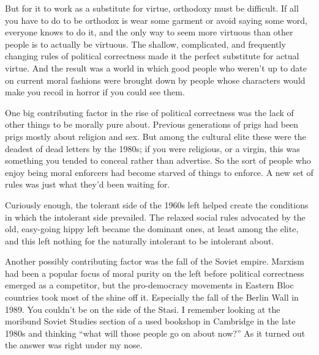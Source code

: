 But for it to work as a substitute for virtue, orthodoxy must be
difficult. If all you have to do to be orthodox is wear some garment or
avoid saying some word, everyone knows to do it, and the only way to
seem more virtuous than other people is to actually be virtuous. The
shallow, complicated, and frequently changing rules of political
correctness made it the perfect substitute for actual virtue. And the
result was a world in which good people who weren't up to date on
current moral fashions were brought down by people whose characters
would make you recoil in horror if you could see them.

One big contributing factor in the rise of political correctness was the
lack of other things to be morally pure about. Previous generations of
prigs had been prigs mostly about religion and sex. But among the
cultural elite these were the deadest of dead letters by the 1980s; if
you were religious, or a virgin, this was something you tended to
conceal rather than advertise. So the sort of people who enjoy being
moral enforcers had become starved of things to enforce. A new set of
rules was just what they'd been waiting for.

Curiously enough, the tolerant side of the 1960s left helped create the
conditions in which the intolerant side prevailed. The relaxed social
rules advocated by the old, easy-going hippy left became the dominant
ones, at least among the elite, and this left nothing for the naturally
intolerant to be intolerant about.

Another possibly contributing factor was the fall of the Soviet empire.
Marxism had been a popular focus of moral purity on the left before
political correctness emerged as a competitor, but the pro-democracy
movements in Eastern Bloc countries took most of the shine off it.
Especially the fall of the Berlin Wall in 1989. You couldn't be on the
side of the Stasi. I remember looking at the moribund Soviet Studies
section of a used bookshop in Cambridge in the late 1980s and thinking
``what will those people go on about now?'' As it turned out the answer
was right under my nose.

